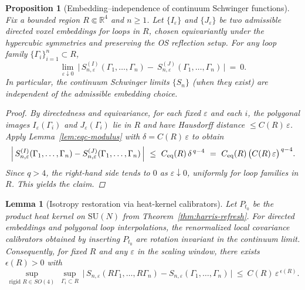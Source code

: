 \documentclass[11pt]{amsart}
\theoremstyle{plain}
\newtheorem{lemma}[theorem]{Lemma}
\newtheorem{proposition}[theorem]{Proposition}
\theoremstyle{definition}
\theoremstyle{remark}
\begin{document}
\begin{proposition}[Embedding–independence of continuum Schwinger functions]\label{prop:embedding-independence}
Fix a bounded region $R\Subset\mathbb R^4$ and $n\ge 1$. Let $\{I_\varepsilon\}$ and $\{J_\varepsilon\}$ be two admissible directed voxel embeddings for loops in $R$, chosen equivariantly under the hypercubic symmetries and preserving the OS reflection setup. For any loop family $\{\Gamma_i\}_{i=1}^n\subset R$,
\[
  \lim_{\varepsilon\downarrow 0}\ \Big|\,S_{n,\varepsilon}^{(I)}(\Gamma_1,\dots,\Gamma_n)
  -\ S_{n,\varepsilon}^{(J)}(\Gamma_1,\dots,\Gamma_n)\,\Big|\ =\ 0.
\]
In particular, the continuum Schwinger limits $\{S_n\}$ (when they exist) are independent of the admissible embedding choice.
\begin{proof}
By directedness and equivariance, for each fixed $\varepsilon$ and each $i$, the polygonal images $I_\varepsilon(\Gamma_i)$ and $J_\varepsilon(\Gamma_i)$ lie in $R$ and have Hausdorff distance $\le C(R)\,\varepsilon$. Apply Lemma~\ref{lem:eqc-modulus} with $\delta=C(R)\,\varepsilon$ to obtain
\[
  \Big|\,S_{n,\varepsilon}^{(I)}(\Gamma_1,\dots,\Gamma_n)
   - S_{n,\varepsilon}^{(J)}(\Gamma_1,\dots,\Gamma_n)\,\Big|
  \ \le\ C_{\rm eq}(R)\,\delta^{\,q-4}
  \ =\ C_{\rm eq}(R)\,\big(C(R)\,\varepsilon\big)^{\,q-4}.
\]
Since $q>4$, the right-hand side tends to $0$ as $\varepsilon\downarrow 0$, uniformly for loop families in $R$. This yields the claim.
\end{proof}
\end{proposition}

\begin{lemma}[Isotropy restoration via heat-kernel calibrators]\label{lem:isotropy-restore}
Let $P_{t_0}$ be the product heat kernel on $\mathrm{SU}(N)$ from Theorem~\ref{thm:harris-refresh}. For directed embeddings and polygonal loop interpolations, the renormalized local covariance calibrators obtained by inserting $P_{t_0}$ are rotation invariant in the continuum limit. Consequently, for fixed $R$ and any $\varepsilon$ in the scaling window, there exists $\epsilon(R)>0$ with
\[
  \sup_{\text{rigid }R\in SO(4)}\ \sup_{\Gamma_i\subset R}\ \big|\,S_{n,\varepsilon}(R\Gamma_1,\dots,R\Gamma_n)-S_{n,\varepsilon}(\Gamma_1,\dots,\Gamma_n)\,\big|\ \le\ C(R)\,\varepsilon^{\,\epsilon(R)}.
\]
\end{lemma}
\end{document}
